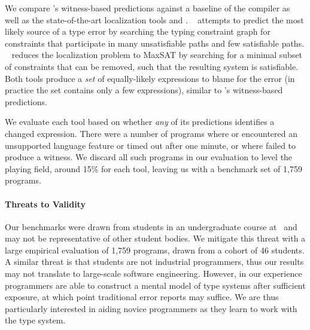 We compare \toolname's witness-based predictions against a baseline of
the \ocaml compiler as well as the state-of-the-art %
localization tools \sherrloc and \mycroft.
%
\sherrloc~\cite{Zhang2014-lv} attempts to predict the most likely source
of a type error by searching the typing constraint graph for constraints
that participate in many unsatisfiable paths and few satisfiable paths.
%
\mycroft~\cite{Loncaric2016-uk} reduces the localization problem to
MaxSAT by searching for a minimal subset of constraints that can be
removed, such that the resulting system is satisfiable.
%
Both tools produce a \emph{set} of equally-likely expressions to blame
for the error (in practice the set contains only a few expressions),
similar to \toolname's witness-based predictions.

We evaluate each tool based on whether \emph{any} of its predictions
identifies a changed expression.
%
There were a number of programs where \mycroft or \sherrloc
encountered an unsupported language feature or timed out after one
minute, or where \toolname failed to produce a witness.
%
We discard all such programs in our evaluation to level the playing
field, around 15\% for each tool, leaving us with a benchmark set of
1,759 programs.

\paragraph{Threats to Validity}
Our benchmarks were drawn from students in an undergraduate course
at \ucsdbench\ and may not be representative of other student bodies.
%
We mitigate this threat with a large empirical evaluation of 1,759
programs, drawn from a cohort of 46 students.
%
A similar threat is that students are not industrial programmers, thus
our results may not translate to large-scale software engineering.
%
%
However, in our experience programmers are able to construct a mental
model of type systems after sufficient exposure, at which point
traditional error reports may suffice.
%
We are thus particularly interested in aiding novice programmers as
they learn to work with the type system.

